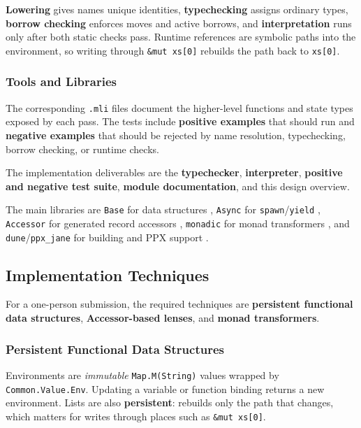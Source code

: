 \documentclass[a4paper]{article}
\begin{document}
\textbf{Lowering} gives names unique identities, \textbf{typechecking} assigns
ordinary types, \textbf{borrow checking} enforces moves and active borrows, and
\textbf{interpretation} runs only after both static checks pass. Runtime
references are symbolic paths into the environment, so writing through
\texttt{\&mut xs[0]} rebuilds the path back to \texttt{xs[0]}.

\subsubsection*{Tools and Libraries}

The corresponding \texttt{.mli} files document the higher-level functions and
state types exposed by each pass. The tests include \textbf{positive examples}
that should run and \textbf{negative examples} that should be rejected by name
resolution, typechecking, borrow checking, or runtime checks.

The implementation deliverables are the \textbf{typechecker},
\textbf{interpreter}, \textbf{positive and negative test suite},
\textbf{module documentation}, and this design overview.

The main libraries are \texttt{Base} for data structures
\cite{janestreet_base}, \texttt{Async} for \texttt{spawn}/\texttt{yield}
\cite{janestreet_async}, \texttt{Accessor} for generated record accessors
\cite{janestreet_accessor}, \texttt{monadic} for monad transformers
\cite{denommus_monadic}, and \texttt{dune}/\texttt{ppx\_jane} for building and
PPX support \cite{dune,janestreet_ppx_jane}.

\subsection{Implementation Techniques}

For a one-person submission, the required techniques are \textbf{persistent
functional data structures}, \textbf{Accessor-based lenses}, and \textbf{monad
transformers}.

\subsubsection{Persistent Functional Data Structures}

Environments are \emph{immutable} \texttt{Map.M(String)} values wrapped by
\texttt{Common.Value.Env}. Updating a variable or function binding returns a new
environment. Lists are also \textbf{persistent}: 
rebuilds only the path that changes, which matters for writes through places such as
\texttt{\&mut xs[0]}.
\end{document}
